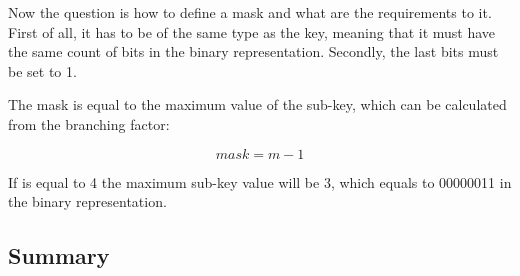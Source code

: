Now the question is how to define a mask and what are the requirements to it. First of all, it has to be of the same type as the key, meaning that it must have the same count of bits in the binary representation. Secondly, the last \x bits must be set to 1.

The mask is equal to the maximum value of the sub-key, which can be calculated from the branching factor:

\begin{equation}
    mask = m - 1
\end{equation}

If \m{} is equal to 4 the maximum sub-key value will be 3, which equals to 00000011 in the binary representation.

\subsection*{Summary}

